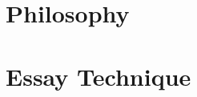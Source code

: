 \documentclass[a4paper]{article}
\begin{document}
\begin{multicols}{2}
\section{Philosophy}



\section{Essay Technique}







\end{multicols}
\end{document}
